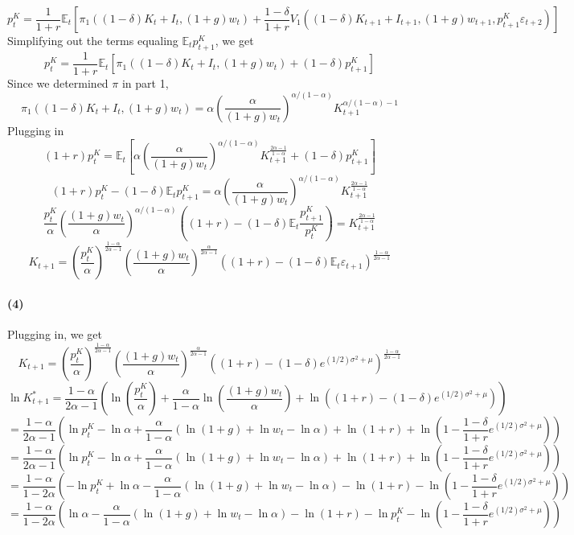 \documentclass[10pt,letter]{article}
\newcommand{\problempart}[1]{\paragraph{#1}}
\begin{document}
\[ p_t^K = \frac{1}{1+r} \mathbb{E}_t\left[\pi_1((1-\delta)K_{t}+I_t, (1+g)w_t) + \frac{1-\delta}{1+r}V_1((1-\delta)K_{t+1} + I_{t+1}, (1+g)w_{t+1}, p^K_{t+1} \varepsilon_{t+2})\right] \]
Simplifying out the terms equaling $\mathbb{E}_t p_{t+1}^K$, we get
\[ p_t^K = \frac{1}{1+r} \mathbb{E}_t\left[\pi_1((1-\delta)K_{t}+I_t, (1+g)w_t) + (1-\delta)p_{t+1}^K\right] \]
Since we determined $\pi$ in part 1,
\[ \pi_1((1-\delta)K_t + I_t, (1+g)w_t) = \alpha \left(\frac{\alpha}{(1+g)w_t} \right)^{\alpha/(1-\alpha)} K_{t+1}^{\alpha/(1-\alpha) - 1} \]
Plugging in
\[ (1+r)p_t^K = \mathbb{E}_t\left[\alpha \left(\frac{\alpha}{(1+g)w_t} \right)^{\alpha/(1-\alpha)} K_{t+1}^{\frac{2\alpha-1}{1-\alpha}} + (1-\delta)p_{t+1}^K\right] \]
\[ (1+r)p_t^K - (1-\delta)\mathbb{E}_tp_{t+1}^K = \alpha \left(\frac{\alpha}{(1+g)w_t} \right)^{\alpha/(1-\alpha)} K_{t+1}^{\frac{2\alpha-1}{1-\alpha}} \]
\[ \frac{p_t^K}{\alpha}\left(\frac{(1+g)w_t}{\alpha} \right)^{\alpha/(1-\alpha)}\left((1+r) - (1-\delta)\mathbb{E}_t\frac{p_{t+1}^K}{p_t^K}\right) =  K_{t+1}^{\frac{2\alpha-1}{1-\alpha}} \]
\[ K_{t+1}  = \left(\frac{p_t^K}{\alpha}\right)^{\frac{1-\alpha}{2\alpha-1}}\left(\frac{(1+g)w_t}{\alpha} \right)^{\frac{\alpha}{2\alpha - 1}}\left((1+r) - (1-\delta)\mathbb{E}_t\varepsilon_{t+1}\right)^{\frac{1-\alpha}{2\alpha-1}}   \]
\problempart{(4)}
Plugging in, we get
\[ K_{t+1}  = \left(\frac{p_t^K}{\alpha}\right)^{\frac{1-\alpha}{2\alpha-1}}\left(\frac{(1+g)w_t}{\alpha} \right)^{\frac{\alpha}{2\alpha - 1}}\left((1+r) - (1-\delta)e^{(1/2) \sigma^2 + \mu}\right)^{\frac{1-\alpha}{2\alpha-1}}   \]
\[ \ln K^*_{t+1} = \frac{1-\alpha}{2\alpha - 1} \left( \ln \left(\frac{p_t^K}{\alpha}\right) + \frac{\alpha}{1-\alpha} \ln \left(\frac{(1+g)w_t}{\alpha} \right) + \ln \left((1+r) - (1-\delta)e^{(1/2) \sigma^2 + \mu}\right)  \right) \]
\[ =  \frac{1-\alpha}{2\alpha - 1} \left( \ln p_t^K - \ln \alpha + \frac{\alpha}{1-\alpha} \left( \ln(1+g) + \ln w_t - \ln \alpha \right) + \ln(1+r) + \ln \left(1 - \frac{1-\delta}{1+r}e^{(1/2) \sigma^2 + \mu}\right)  \right) \]
\[ =  \frac{1-\alpha}{2\alpha - 1} \left( \ln p_t^K - \ln \alpha + \frac{\alpha}{1-\alpha} \left( \ln(1+g) + \ln w_t - \ln \alpha \right) + \ln(1+r) + \ln \left(1 - \frac{1-\delta}{1+r}e^{(1/2) \sigma^2 + \mu}\right)  \right) \]
\[ =  \frac{1-\alpha}{1 - 2\alpha} \left( - \ln p_t^K + \ln \alpha - \frac{\alpha}{1-\alpha} \left( \ln(1+g) + \ln w_t - \ln \alpha \right) - \ln(1+r) - \ln \left(1 - \frac{1-\delta}{1+r}e^{(1/2) \sigma^2 + \mu}\right)  \right) \]
\[ =  \frac{1-\alpha}{1 - 2\alpha} \left( \ln \alpha - \frac{\alpha}{1-\alpha} \left( \ln(1+g) + \ln w_t - \ln \alpha \right) - \ln(1+r)- \ln p_t^K - \ln \left(1 - \frac{1-\delta}{1+r}e^{(1/2) \sigma^2 + \mu}\right)  \right) \]
\end{document}
